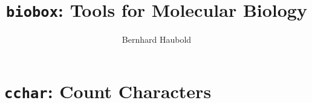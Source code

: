 \documentclass[a4paper]{article}
\begin{document}
\pagestyle{noweb}

\title{\texttt{biobox}: Tools for Molecular Biology}
\author{Bernhard Haubold}
\maketitle
\tableofcontents

\chapter{\texttt{cchar}: Count Characters}\label{ch:cch}



\end{document}
